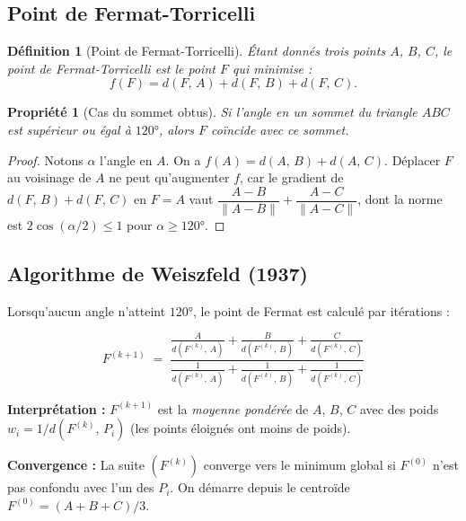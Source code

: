 \documentclass[12pt, a4paper]{article}
\newtheorem{definition}{Définition}
\newtheorem{propriete}{Propriété}
\newcommand{\dist}[2]{d\!\left(#1,\,#2\right)}
\begin{document}
\subsection{Point de Fermat-Torricelli}

\begin{definition}[Point de Fermat-Torricelli]
Étant donnés trois points $A$, $B$, $C$, le point de Fermat-Torricelli est le point
$F$ qui minimise :
\[
    f(F) = \dist{F}{A} + \dist{F}{B} + \dist{F}{C}.
\]
\end{definition}

\begin{propriete}[Cas du sommet obtus]
Si l'angle en un sommet du triangle $ABC$ est supérieur ou égal à $120°$, alors
$F$ coïncide avec ce sommet.
\end{propriete}

\begin{proof}
Notons $\alpha$ l'angle en $A$. On a $f(A) = \dist{A}{B} + \dist{A}{C}$.
Déplacer $F$ au voisinage de $A$ ne peut qu'augmenter $f$, car le gradient de
$\dist{F}{B} + \dist{F}{C}$ en $F = A$ vaut $\dfrac{A-B}{\|A-B\|} + \dfrac{A-C}{\|A-C\|}$,
dont la norme est $2\cos(\alpha/2) \leq 1$ pour $\alpha \geq 120°$.
\end{proof}

\subsection{Algorithme de Weiszfeld (1937)}

Lorsqu'aucun angle n'atteint $120°$, le point de Fermat est calculé par itérations :

\begin{equation}
\label{eq:weiszfeld}
    F^{(k+1)} \;=\;
    \frac{\displaystyle\frac{A}{\dist{F^{(k)}}{A}}
        + \frac{B}{\dist{F^{(k)}}{B}}
        + \frac{C}{\dist{F^{(k)}}{C}}}
         {\displaystyle\frac{1}{\dist{F^{(k)}}{A}}
        + \frac{1}{\dist{F^{(k)}}{B}}
        + \frac{1}{\dist{F^{(k)}}{C}}}
\end{equation}

\textbf{Interprétation :} $F^{(k+1)}$ est la \emph{moyenne pondérée} de $A$, $B$, $C$
avec des poids $w_i = 1/\dist{F^{(k)}}{P_i}$ (les points éloignés ont moins de poids).

\medskip

\textbf{Convergence :} La suite $(F^{(k)})$ converge vers le minimum global si $F^{(0)}$
n'est pas confondu avec l'un des $P_i$. On démarre depuis le centroïde
$F^{(0)} = (A + B + C)/3$.
\end{document}
